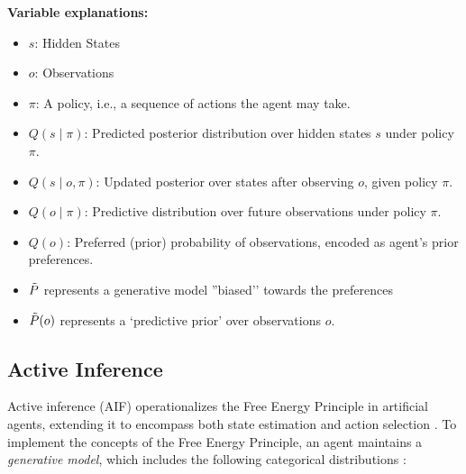 

\textbf{Variable explanations:}
\begin{itemize}
  \item $s$: Hidden States
  \item $o$: Observations
  \item $\pi$: A policy, i.e., a sequence of actions the agent may take.
  \item $Q(s \mid \pi)$: Predicted posterior distribution over hidden states $s$ under policy $\pi$.
  \item $Q(s \mid o, \pi)$: Updated posterior over states after observing $o$, given policy $\pi$.
  \item $Q(o \mid \pi)$: Predictive distribution over future observations under policy $\pi$.
  \item $Q(o)$: Preferred (prior) probability of observations, encoded as agent’s prior preferences.
  \item \(\Tilde{P}\) represents a generative model ''biased'’ towards the preferences
  \item \(\Tilde{P}(o)\) represents a ‘predictive prior’ over observations \(o\).
 
\end{itemize}




\subsection{Active Inference}
Active inference (AIF) operationalizes the Free Energy Principle in artificial agents, extending it to encompass both state estimation and action selection \cite{sedlak_equilibrium_2024, lanillos_active_2021}. To implement the concepts of the Free Energy Principle, an agent maintains a \textit{generative model}, which includes the following categorical distributions \cite{heins_pymdp_2022}:

